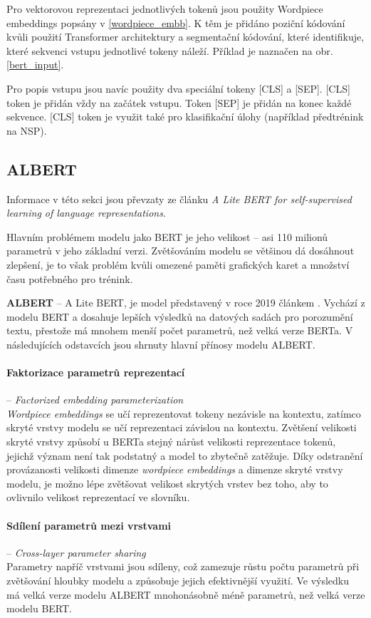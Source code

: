 Pro vektorovou reprezentaci jednotlivých tokenů jsou použity Wordpiece embeddings \cite{wordpiece} popsány v \ref{wordpiece_embb}. K těm je přidáno poziční kódování kvůli použití Transformer architektury a segmentační kódování, které identifikuje, které sekvenci vstupu jednotlivé tokeny náleží. Příklad je naznačen na obr. \ref{bert_input}.\par
Pro popis vstupu jsou navíc použity dva speciální tokeny [CLS] a [SEP]. [CLS] token je přidán vždy na začátek vstupu. Token [SEP] je přidán na konec každé sekvence. [CLS] token je využit také pro klasifikační úlohy (například předtrénink na NSP).

\subsection{ALBERT}
Informace v této sekci jsou převzaty ze článku \cite{ALBERT} \emph{A Lite BERT for self-supervised learning of language representations}.\par
Hlavním problémem modelu jako BERT je jeho velikost -- asi 110 milionů parametrů v jeho základní verzi. Zvětšováním modelu se většinou dá dosáhnout zlepšení, je to však problém kvůli omezené paměti grafických karet a množství času potřebného pro trénink.\par
\textbf{ALBERT} -- A Lite BERT, je model představený v roce 2019 článkem \cite{ALBERT}. Vychází z modelu BERT a dosahuje lepších výsledků na datových sadách pro porozumění textu, přestože má mnohem menší počet parametrů, než velká verze BERTa. V následujících odstavcích jsou shrnuty hlavní přínosy modelu ALBERT.

\paragraph{Faktorizace parametrů reprezentací} -- \emph{Factorized embedding parameterization}\\ 
\emph{Wordpiece embeddings} se učí reprezentovat tokeny nezávisle na kontextu, zatímco skryté vrstvy modelu se učí reprezentaci závislou na kontextu. Zvětšení velikosti skryté vrstvy způsobí u BERTa stejný nárůst velikosti reprezentace tokenů, jejichž význam není tak podstatný a model to zbytečně zatěžuje.
Díky odstranění provázanosti velikosti dimenze \emph{wordpiece embeddings} a dimenze skryté vrstvy modelu, je možno lépe zvětšovat velikost skrytých vrstev bez toho, aby to ovlivnilo velikost reprezentací ve slovníku.

\paragraph{Sdílení parametrů mezi vrstvami} -- \textit{Cross-layer parameter sharing}\\
Parametry napříč vrstvami jsou sdíleny, což zamezuje růstu počtu parametrů při zvětšování hloubky modelu a způsobuje jejich efektivnější využití. Ve výsledku má velká verze modelu ALBERT mnohonásobně méně parametrů, než velká verze modelu BERT.

